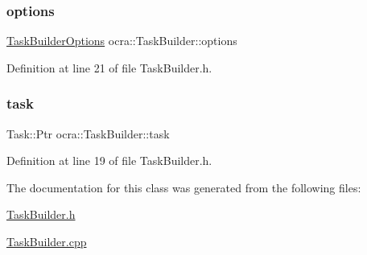 \subsubsection{\texorpdfstring{options}{options}}
{\footnotesize\ttfamily \hyperlink{classocra_1_1TaskBuilderOptions}{Task\+Builder\+Options} ocra\+::\+Task\+Builder\+::options\hspace{0.3cm}{\ttfamily [protected]}}



Definition at line 21 of file Task\+Builder.\+h.

\hypertarget{classocra_1_1TaskBuilder_ad3f099d23545d5d55d55ac2cf3d93b4d}{}\label{classocra_1_1TaskBuilder_ad3f099d23545d5d55d55ac2cf3d93b4d} 
\subsubsection{\texorpdfstring{task}{task}}
{\footnotesize\ttfamily Task\+::\+Ptr ocra\+::\+Task\+Builder\+::task\hspace{0.3cm}{\ttfamily [protected]}}



Definition at line 19 of file Task\+Builder.\+h.



The documentation for this class was generated from the following files\+:\begin{DoxyCompactItemize}
\item 
\hyperlink{TaskBuilder_8h}{Task\+Builder.\+h}\item 
\hyperlink{TaskBuilder_8cpp}{Task\+Builder.\+cpp}\end{DoxyCompactItemize}

